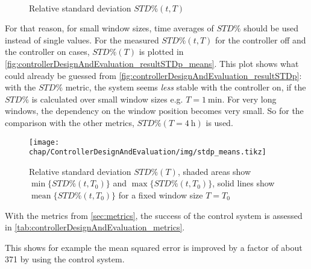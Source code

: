 \begin{figure}[tb]
    \centering
        \\
       \caption{Relative standard deviation $STD\%(t,T)$}
    \label{fig:controllerDesignAndEvaluation_resultSTDp}
\end{figure}

For that reason, for small window sizes, time averages of $STD\%$ should be used instead of single values. For the measured $STD\%(t,T)$ for the controller off and the controller on cases, $STD\%(T)$ is plotted in \autoref{fig:controllerDesignAndEvaluation_resultSTDp_means}. This plot shows what could already be guessed from \autoref{fig:controllerDesignAndEvaluation_resultSTDp}: with the $STD\%$ metric, the system seems \textit{less} stable with the controller on, if the $STD\%$ is calculated over small window sizes e.g. $T=\SI{1}{\minute}$. For very long windows, the dependency on the window position becomes very small. So for the comparison with the other metrics, $STD\%(T=\SI{4}{\hour})$ is used.

\begin{figure}[tb]
	\centering
	\texttt{[image: chap/ControllerDesignAndEvaluation/img/stdp\_means.tikz]}
	\caption{Relative standard deviation $STD\%(T)$, shaded areas show $\operatorname{min}\{STD\%(t,T_0)\}$ and $\operatorname{max}\{STD\%(t,T_0)\}$, solid lines show $\operatorname{mean}\{STD\%(t,T_0)\}$ for a fixed window size $T=T_0$}
	\label{fig:controllerDesignAndEvaluation_resultSTDp_means}
\end{figure}


With the metrics from \autoref{sec:metrics}, the success of the control system is assessed in \autoref{tab:controllerDesignAndEvaluation_metrics}.

This shows for example the mean squared error is improved by a factor of about \num{371} by using the control system.

